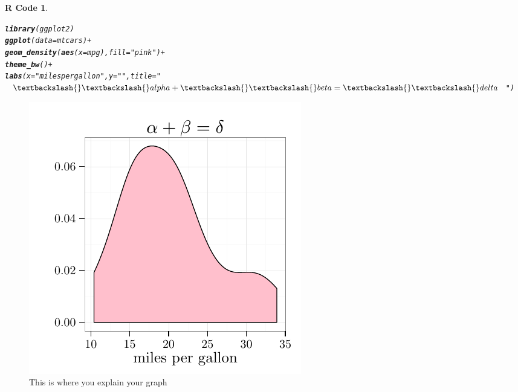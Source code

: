 \documentclass{article}\usepackage[]{graphicx}\usepackage[]{color}
\makeatletter
\def\maxwidth{ %
  \ifdim\Gin@nat@width>\linewidth
    \linewidth
  \else
    \Gin@nat@width
  \fi
}
\newcommand{\hlstr}[1]{\textcolor[rgb]{0.192,0.494,0.8}{#1}}%
\newcommand{\hlopt}[1]{\textcolor[rgb]{0,0,0}{#1}}%
\newcommand{\hlstd}[1]{\textcolor[rgb]{0.345,0.345,0.345}{#1}}%
\newcommand{\hlkwc}[1]{\textcolor[rgb]{0.333,0.667,0.333}{#1}}%
\newcommand{\hlkwd}[1]{\textcolor[rgb]{0.737,0.353,0.396}{\textbf{#1}}}%
\newenvironment{kframe}{%
 \def\at@end@of@kframe{}%
 \ifinner\ifhmode%
  \def\at@end@of@kframe{\end{minipage}}%
  \begin{minipage}{\columnwidth}%
 \fi\fi%
 \def\FrameCommand##1{\hskip\@totalleftmargin \hskip-\fboxsep
 \colorbox{shadecolor}{##1}\hskip-\fboxsep
     \hskip-\linewidth \hskip-\@totalleftmargin \hskip\columnwidth}%
 \MakeFramed {\advance\hsize-\width
   \@totalleftmargin\z@ \linewidth\hsize
   \@setminipage}}%
 {\par\unskip\endMakeFramed%
 \at@end@of@kframe}
\newenvironment{knitrout}{}{} %
\theoremstyle{rcode}
\newtheorem{rcode}{R Code}[section]
\makeatother
\begin{document}
\begin{knitrout}
\color{fgcolor}\begin{kframe}
\begin{rcode}\label{Graph}\hfill{}\begin{alltt}
\hlkwd{library}\hlstd{(ggplot2)}
\hlkwd{ggplot}\hlstd{(}\hlkwc{data} \hlstd{= mtcars)} \hlopt{+}
  \hlkwd{geom_density}\hlstd{(}\hlkwd{aes}\hlstd{(}\hlkwc{x} \hlstd{= mpg),} \hlkwc{fill} \hlstd{=} \hlstr{"pink"}\hlstd{)} \hlopt{+}
  \hlkwd{theme_bw}\hlstd{()} \hlopt{+}
  \hlkwd{labs}\hlstd{(}\hlkwc{x} \hlstd{=} \hlstr{"miles per gallon"}\hlstd{,} \hlkwc{y} \hlstd{=} \hlstr{""}\hlstd{,} \hlkwc{title} \hlstd{=} \hlstr{"$\textbackslash{}\textbackslash{}alpha + \textbackslash{}\textbackslash{}beta = \textbackslash{}\textbackslash{}delta$"}\hlstd{)}
\end{alltt}
\end{rcode}\end{kframe}
\end{knitrout}


\begin{figure}[h]
\begin{knitrout}
\color{fgcolor}

{\centering \includegraphics[width=\maxwidth]{figure/GraphShow} 

}



\end{knitrout}

\caption{This is where you explain your graph \label{graphDude}}
\end{figure}
\end{document}
